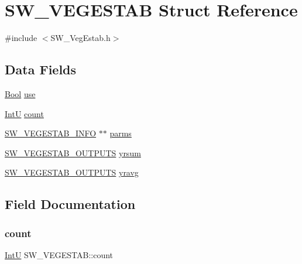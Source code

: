 \hypertarget{struct_s_w___v_e_g_e_s_t_a_b}{}\section{S\+W\+\_\+\+V\+E\+G\+E\+S\+T\+AB Struct Reference}
\label{struct_s_w___v_e_g_e_s_t_a_b}


{\ttfamily \#include $<$S\+W\+\_\+\+Veg\+Estab.\+h$>$}

\subsection*{Data Fields}
\begin{DoxyCompactItemize}
\item 
\hyperlink{generic_8h_a39db6982619d623273fad8a383489309}{Bool} \hyperlink{struct_s_w___v_e_g_e_s_t_a_b_a9872d00f71ccada3933694bb6eedd487}{use}
\item 
\hyperlink{generic_8h_a9c7b81b51177020e4735ba49298cf62b}{IntU} \hyperlink{struct_s_w___v_e_g_e_s_t_a_b_a92ccdbe60aa9b10d6b62e6c3748d09a0}{count}
\item 
\hyperlink{struct_s_w___v_e_g_e_s_t_a_b___i_n_f_o}{S\+W\+\_\+\+V\+E\+G\+E\+S\+T\+A\+B\+\_\+\+I\+N\+FO} $\ast$$\ast$ \hyperlink{struct_s_w___v_e_g_e_s_t_a_b_aa899661a9762cfbc13ea36468f1057e5}{parms}
\item 
\hyperlink{struct_s_w___v_e_g_e_s_t_a_b___o_u_t_p_u_t_s}{S\+W\+\_\+\+V\+E\+G\+E\+S\+T\+A\+B\+\_\+\+O\+U\+T\+P\+U\+TS} \hyperlink{struct_s_w___v_e_g_e_s_t_a_b_ac2a02c6a1b5ca73fc08ce0616557a61a}{yrsum}
\item 
\hyperlink{struct_s_w___v_e_g_e_s_t_a_b___o_u_t_p_u_t_s}{S\+W\+\_\+\+V\+E\+G\+E\+S\+T\+A\+B\+\_\+\+O\+U\+T\+P\+U\+TS} \hyperlink{struct_s_w___v_e_g_e_s_t_a_b_a30d9632d4c70acffd90399c8fc6f178d}{yravg}
\end{DoxyCompactItemize}


\subsection{Field Documentation}
\mbox{\label{struct_s_w___v_e_g_e_s_t_a_b_a92ccdbe60aa9b10d6b62e6c3748d09a0}} 
\subsubsection{\texorpdfstring{count}{count}}
{\footnotesize\ttfamily \hyperlink{generic_8h_a9c7b81b51177020e4735ba49298cf62b}{IntU} S\+W\+\_\+\+V\+E\+G\+E\+S\+T\+A\+B\+::count}



